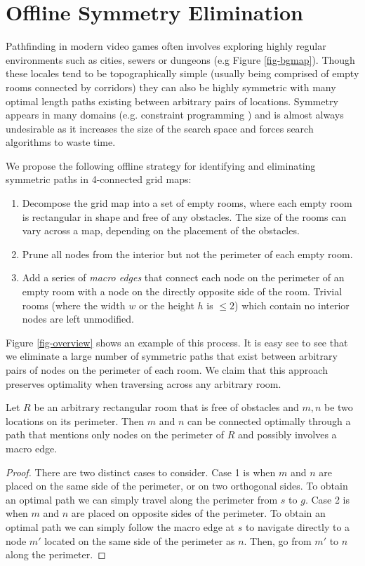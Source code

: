 \section{Offline Symmetry Elimination}
\label{algorithm}
Pathfinding in modern video games often involves exploring highly regular 
environments such as cities, sewers or dungeons (e.g Figure \ref{fig-bgmap}).
Though these locales tend to be topographically simple (usually being comprised
of empty rooms connected by corridors) they can also be highly symmetric 
with many optimal length paths existing between arbitrary pairs of locations.
Symmetry appears in many domains (e.g. constraint programming \cite{walsh07}) and is 
almost always undesirable as it increases the size of the search space
and forces search algorithms to waste time.
\par
We propose the following offline strategy for identifying and eliminating symmetric paths in 
4-connected grid maps:
\begin{enumerate}
\item{Decompose the grid map into a set of empty rooms, where each empty room is 
rectangular in shape and free of any obstacles. 
The size of the rooms can vary across a map, depending
on the placement of the obstacles.}
\item{Prune all nodes from the interior but not the perimeter of each empty
room.}
\item{Add a series of \emph{macro edges} that connect each node on the perimeter of an empty room
with a node on the directly opposite side of the room.
Trivial rooms (where the width $w$ or the height $h$ is $\leq 2$) which contain
no interior nodes are left unmodified.}
\end{enumerate}
Figure \ref{fig-overview} shows an example of this process.
It is easy see to see that we eliminate a large number of symmetric paths
that exist between arbitrary pairs of nodes on the perimeter of each room.
We claim that this approach preserves optimality when traversing across any arbitrary room.

\begin{lemma}
\label{thm-roomtraversal}
Let $R$ be an arbitrary rectangular room that is free of obstacles
and $m, n$ be two locations on its perimeter.
Then $m$ and $n$ can be connected optimally through a path that
mentions only nodes on the perimeter of $R$ and possibly involves
a macro edge.
\end{lemma}
\begin{proof}
\par
There are two distinct cases to consider.
Case 1 is when $m$ and $n$ are placed on the same side of the perimeter, or
on two orthogonal sides. 
To obtain an optimal path we can simply travel along the perimeter from $s$ to $g$.
Case 2 is when $m$ and $n$ are placed on opposite sides of the perimeter.
To obtain an optimal path we can simply follow the macro edge at $s$ 
to navigate directly to a node $m'$ located on
the same side of the perimeter as $n$. Then, go from $m'$ to $n$ along the perimeter.
\end{proof}

